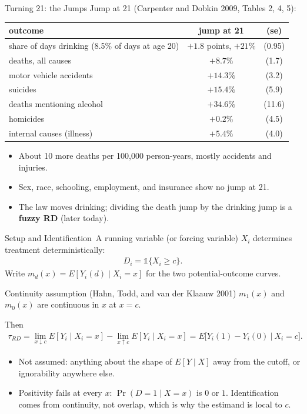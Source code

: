 \documentclass[aspectratio=169,11pt,xcolor=dvipsnames]{beamer}
\newcommand{\srcp}[1]{{\scriptsize\color{gray}(#1)}}
\newcommand{\E}{E}
\newcommand{\core}{\,\raisebox{0.6pt}{\textcolor{corestar}{$\bigstar$}}}
\begin{document}
\begin{frame}{Turning 21: the Jumps}
Jump at 21 \srcp{Carpenter and Dobkin 2009, Tables 2, 4, 5}:
\vskip-2pt
\begin{center}\footnotesize
\renewcommand{\arraystretch}{1.05}
\begin{tabular}{@{}lcc@{}}
\toprule
outcome & jump at 21 & (se) \\
\midrule
share of days drinking (8.5\% of days at age 20) & $+1.8$ points, \alert{$+21\%$} & (0.95) \\
\midrule
deaths, all causes & \alert{$+8.7\%$} & (1.7) \\
\quad motor vehicle accidents & $+14.3\%$ & (3.2) \\
\quad suicides & $+15.4\%$ & (5.9) \\
\quad deaths mentioning alcohol & $+34.6\%$ & (11.6) \\
\quad homicides & $+0.2\%$ & (4.5) \\
\quad internal causes (illness) & $+5.4\%$ & (4.0) \\
\bottomrule
\end{tabular}
\end{center}
\vskip-2pt
\begin{itemize}\itemsep1pt
  \item About 10 more deaths per 100,000 person-years, mostly accidents and injuries.
  \item Sex, race, schooling, employment, and insurance show no jump at 21.
  \item The law moves drinking; dividing the death jump by the drinking jump is a
        \textbf{fuzzy RD} (later today).
\end{itemize}
\end{frame}

\begin{frame}{Setup and Identification\core}
A \alert{running variable} (or forcing variable) $X_i$ determines treatment
deterministically:
\begin{align*}
  D_i = \mathds{1}\{X_i \geq c\} .
\end{align*}
Write $m_d(x) = \E[Y_i(d)\mid X_i = x]$ for the two potential-outcome curves.
\vskip2pt
\begin{block}{Continuity assumption \srcp{Hahn, Todd, and van der Klaauw 2001}}
$m_1(x)$ and $m_0(x)$ are continuous in $x$ at $x = c$.
\end{block}
\vskip3pt
Then
\begin{align*}
  \tau_{RD} = \lim_{x\downarrow c}\E[Y_i\mid X_i = x]
            - \lim_{x\uparrow c}\E[Y_i\mid X_i = x]
            = \E\big[Y_i(1)-Y_i(0)\ \big|\ X_i = c\big] .
\end{align*}
\vskip2pt
\begin{itemize}\itemsep2pt
  \item Not assumed: anything about the shape of $\E[Y\mid X]$ away from
        the cutoff, or ignorability anywhere else.
  \item \alert{Positivity fails at every $x$}: $\Pr(D=1\mid X=x)$ is $0$ or $1$.
        Identification comes from continuity, not overlap, which is why the
        estimand is local to $c$.
\end{itemize}
\end{frame}
\end{document}
